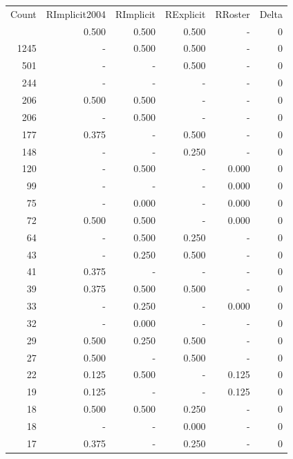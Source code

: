 \documentclass[a4paper]{article}\usepackage[]{graphicx}\usepackage[]{color}
\begin{document}
\begin{table}[ht]
\centering
\begin{tabular}{rrrrrr}
  \hline
Count & RImplicit2004 & RImplicit & RExplicit & RRoster & Delta \\ 
  \rowcolor{goodColor}  \hline
1446 & 0.500 & 0.500 & 0.500 & - & 0 \\ 
   \rowcolor{goodColor} 1245 & - & 0.500 & 0.500 & - & 0 \\ 
   \rowcolor{sosoColor} 501 & - & - & 0.500 & - & 0 \\ 
   \rowcolor{nullColor} 244 & - & - & - & - & 0 \\ 
  206 & 0.500 & 0.500 & - & - & 0 \\ 
  206 & - & 0.500 & - & - & 0 \\ 
   \rowcolor{sosoColor} 177 & 0.375 & - & 0.500 & - & 0 \\ 
   \rowcolor{sosoColor} 148 & - & - & 0.250 & - & 0 \\ 
  120 & - & 0.500 & - & 0.000 & 0 \\ 
   \rowcolor{nullColor} 99 & - & - & - & 0.000 & 0 \\ 
  75 & - & 0.000 & - & 0.000 & 0 \\ 
  72 & 0.500 & 0.500 & - & 0.000 & 0 \\ 
   \rowcolor{badColor} 64 & - & 0.500 & 0.250 & - & 0 \\ 
   \rowcolor{badColor} 43 & - & 0.250 & 0.500 & - & 0 \\ 
   \rowcolor{nullColor} 41 & 0.375 & - & - & - & 0 \\ 
   \rowcolor{goodColor} 39 & 0.375 & 0.500 & 0.500 & - & 0 \\ 
  33 & - & 0.250 & - & 0.000 & 0 \\ 
  32 & - & 0.000 & - & - & 0 \\ 
   \rowcolor{badColor} 29 & 0.500 & 0.250 & 0.500 & - & 0 \\ 
   \rowcolor{sosoColor} 27 & 0.500 & - & 0.500 & - & 0 \\ 
  22 & 0.125 & 0.500 & - & 0.125 & 0 \\ 
   \rowcolor{nullColor} 19 & 0.125 & - & - & 0.125 & 0 \\ 
   \rowcolor{badColor} 18 & 0.500 & 0.500 & 0.250 & - & 0 \\ 
   \rowcolor{sosoColor} 18 & - & - & 0.000 & - & 0 \\ 
   \rowcolor{sosoColor} 17 & 0.375 & - & 0.250 & - & 0 \\ 

\end{tabular}
\end{table}
\end{document}
